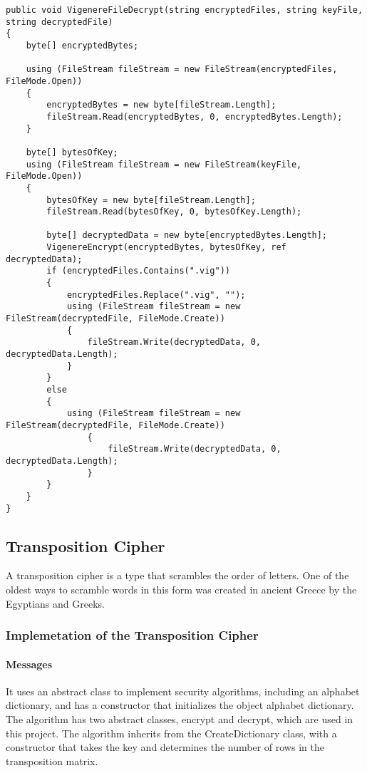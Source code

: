 \begin{lstlisting}[caption=Vigenère Cipher File Source Code]
public void VigenereFileDecrypt(string encryptedFiles, string keyFile, string decryptedFile)
{
    byte[] encryptedBytes;

    using (FileStream fileStream = new FileStream(encryptedFiles, FileMode.Open))
    {
        encryptedBytes = new byte[fileStream.Length];
        fileStream.Read(encryptedBytes, 0, encryptedBytes.Length);
    }

    byte[] bytesOfKey;
    using (FileStream fileStream = new FileStream(keyFile, FileMode.Open))
    {
        bytesOfKey = new byte[fileStream.Length];
        fileStream.Read(bytesOfKey, 0, bytesOfKey.Length);            
            
        byte[] decryptedData = new byte[encryptedBytes.Length];
        VigenereEncrypt(encryptedBytes, bytesOfKey, ref decryptedData);
        if (encryptedFiles.Contains(".vig"))
        {
            encryptedFiles.Replace(".vig", "");
            using (FileStream fileStream = new FileStream(decryptedFile, FileMode.Create))
            {
                fileStream.Write(decryptedData, 0, decryptedData.Length);
            }
        }
        else
        {
            using (FileStream fileStream = new FileStream(decryptedFile, FileMode.Create))
                {
                    fileStream.Write(decryptedData, 0, decryptedData.Length);
                }
        }
    }
}
\end{lstlisting}

\subsection{Transposition Cipher}
A transposition cipher is a type that scrambles the order of letters. One of the oldest ways to scramble words in this form was created in ancient Greece by the Egyptians and Greeks. 

\subsubsection{Implemetation of the Transposition Cipher}

\paragraph{Messages\\}

It uses an abstract class to implement security algorithms, including an alphabet dictionary, and has a constructor that initializes the object alphabet dictionary. The algorithm has two abstract classes, encrypt and decrypt, which are used in this project. The algorithm inherits from the CreateDictionary class, with a constructor that takes the key and determines the number of rows in the transposition matrix. 

